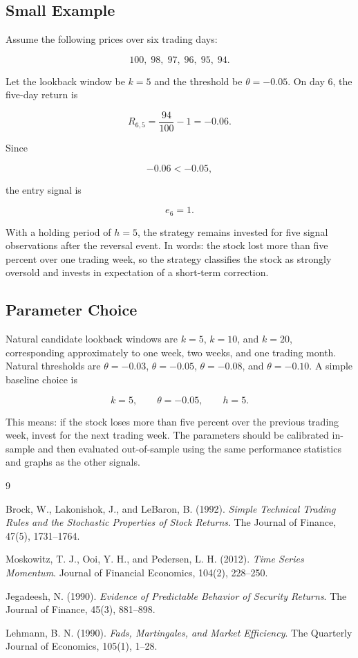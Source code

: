 \documentclass[11pt]{article}
\begin{document}
\subsection*{Small Example}

Assume the following prices over six trading days:

\[
100,\;98,\;97,\;96,\;95,\;94.
\]

Let the lookback window be $k=5$ and the threshold be $\theta=-0.05$. On day 6,
the five-day return is

\[
R_{6,5} = \frac{94}{100} - 1 = -0.06.
\]

Since

\[
-0.06 < -0.05,
\]

the entry signal is

\[
e_6 = 1.
\]

With a holding period of $h=5$, the strategy remains invested for five signal
observations after the reversal event. In words: the stock lost more than five
percent over one trading week, so the strategy classifies the stock as strongly
oversold and invests in expectation of a short-term correction.

\subsection*{Parameter Choice}

Natural candidate lookback windows are $k=5$, $k=10$, and $k=20$, corresponding
approximately to one week, two weeks, and one trading month. Natural thresholds
are $\theta=-0.03$, $\theta=-0.05$, $\theta=-0.08$, and $\theta=-0.10$. A simple
baseline choice is

\[
k=5, \qquad \theta=-0.05, \qquad h=5.
\]

This means: if the stock loses more than five percent over the previous trading
week, invest for the next trading week. The parameters should be calibrated
in-sample and then evaluated out-of-sample using the same performance statistics
and graphs as the other signals.

\begin{thebibliography}{9}

Brock, W., Lakonishok, J., and LeBaron, B. (1992).
\textit{Simple Technical Trading Rules and the Stochastic Properties of Stock Returns}.
The Journal of Finance, 47(5), 1731--1764.

Moskowitz, T. J., Ooi, Y. H., and Pedersen, L. H. (2012).
\textit{Time Series Momentum}.
Journal of Financial Economics, 104(2), 228--250.


Jegadeesh, N. (1990).
\textit{Evidence of Predictable Behavior of Security Returns}.
The Journal of Finance, 45(3), 881--898.

Lehmann, B. N. (1990).
\textit{Fads, Martingales, and Market Efficiency}.
The Quarterly Journal of Economics, 105(1), 1--28.

\end{thebibliography}
\end{document}
